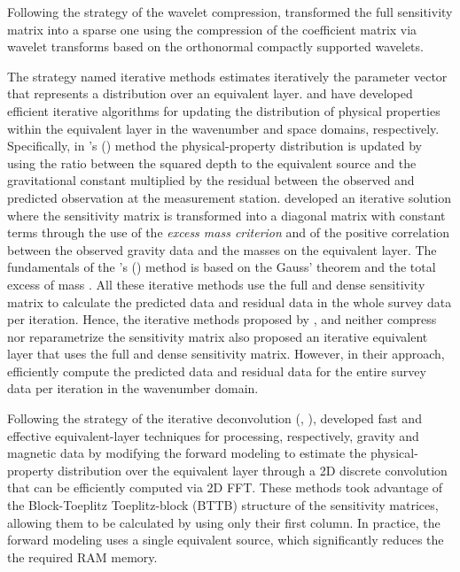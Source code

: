 Following the strategy of the  wavelet compression, \cite{li-oldenburg2010} transformed the full sensitivity matrix into a sparse one using the compression of the coefficient matrix via wavelet transforms based on the orthonormal compactly supported wavelets. 

The strategy named iterative methods estimates iteratively the parameter vector that represents a distribution over an equivalent layer.
\cite{xia-sprowl1991} and \cite{xia-etal1993} have developed efficient iterative algorithms 
for updating the distribution of physical properties within the equivalent layer in the wavenumber and space domains, respectively.
Specifically, in \citeauthor{xia-sprowl1991}'s (\citeyear{xia-sprowl1991}) method the physical-property distribution is updated by using the ratio between the squared depth to the equivalent source and the gravitational constant multiplied by the residual between the observed and predicted observation at the measurement station. 
\cite{siqueira-etal2017} developed an iterative solution where the sensitivity matrix is transformed into a diagonal matrix with constant terms through the use of the \textit{excess mass criterion} and of the positive correlation between the observed gravity data and the masses on the equivalent layer.
The fundamentals of the \citeauthor{siqueira-etal2017}'s (\citeyear{siqueira-etal2017}) method
is  based on the Gauss' theorem \cite[e.g.,][p. 43]{kellogg1967} and the total excess of mass \cite[e.g.,][p. 60]{blakely1996}.
All these iterative methods use the full and dense sensitivity matrix to calculate the predicted data 
and residual data in the whole survey data per iteration.
Hence, the iterative methods proposed by \cite{xia-sprowl1991}, \cite{xia-etal1993} and 
\cite{siqueira-etal2017} neither compress nor reparametrize the sensitivity  matrix
\cite{jirigalatu-ebbing2019} also proposed an iterative equivalent layer that uses the full and dense sensitivity matrix. 
However, in their approach, \cite{jirigalatu-ebbing2019}  efficiently compute  the predicted data and 
residual data for the entire survey data per iteration in the wavenumber domain.

Following the strategy of the  iterative deconvolution \citeauthor{takahashi-etal2020} (\citeyear{takahashi-etal2020}, \citeyear{takahashi-etal2022}), developed fast and effective equivalent-layer techniques for processing, respectively,  gravity and magnetic data by modifying the forward modeling to estimate the physical-property distribution  over the equivalent layer through a 2D discrete convolution that can be efficiently 
computed via 2D FFT.
These methods took advantage of the Block-Toeplitz Toeplitz-block (BTTB) structure of the sensitivity matrices, allowing them to be calculated by using only their first column.
In practice, the forward modeling uses a single equivalent source, which significantly reduces the the required RAM memory. 


